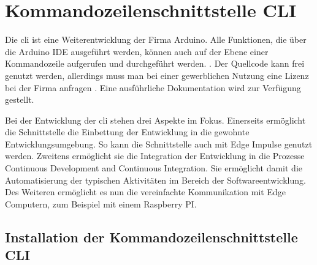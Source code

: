 %
%




\chapter{Kommandozeilenschnittstelle CLI}

Die \ac{cli} ist eine Weiterentwicklung der Firma Arduino. Alle Funktionen, die über die Arduino IDE ausgeführt werden, können auch auf der Ebene einer Kommandozeile aufgerufen und durchgeführt werden. \cite{ArduinoCLI:2022}. Der Quellcode  kann frei genutzt werden, allerdings muss man bei einer gewerblichen Nutzung eine Lizenz bei der Firma anfragen \cite{ArduinoCLIGit:2022}. Eine ausführliche Dokumentation wird zur Verfügung gestellt. \cite{ArduinoCLIIntro:2020,ArduinoCLIDoc:2022}

Bei der Entwicklung der \ac{cli} stehen drei Aspekte im Fokus. Einerseits ermöglicht die Schnittstelle die Einbettung der Entwicklung in die gewohnte Entwicklungsumgebung. So kann die Schnittstelle auch mit  Edge Impulse genutzt werden. Zweitens ermöglicht sie die Integration der Entwicklung in die Prozesse Continuous Development and Continuous Integration. Sie ermöglicht damit die Automatisierung der typischen Aktivitäten im Bereich der Softwareentwicklung. Des Weiteren ermöglicht es nun die vereinfachte Kommunikation mit Edge Computern, zum Beispiel mit einem Raspberry PI.



\section{Installation der Kommandozeilenschnittstelle CLI}


